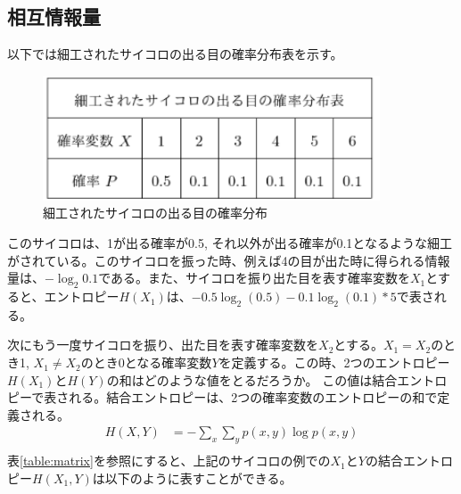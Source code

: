 \documentclass{ltjsarticle}
\begin{document}
\subsection{相互情報量}
以下では細工されたサイコロの出る目の確率分布表を示す。
\begin{figure}[htbp]
  \centering
  \includegraphics[width=10cm]{./entropy.png}
  \caption{細工されたサイコロの出る目の確率分布}
  \label{fig:dise_entropy}
\end{figure}
このサイコロは、1が出る確率が0.5, それ以外が出る確率が0.1となるような細工がされている。このサイコロを振った時、例えば4の目が出た時に得られる情報量は、$-\log_{2} 0.1$である。また、サイコロを振り出た目を表す確率変数を$X_1$とすると、エントロピー$H(X_1)$は、$-0.5\log_{2}(0.5) - 0.1\log_{2}(0.1) * 5$で表される。

次にもう一度サイコロを振り、出た目を表す確率変数を$X_2$とする。$X_1 = X_2$のとき1, $X_1 \neq X_2$のとき0となる確率変数$Y$を定義する。この時、2つのエントロピー$H(X_1)$と$H(Y)$の和はどのような値をとるだろうか。
この値は結合エントロピーで表される。結合エントロピーは、2つの確率変数のエントロピーの和で定義される。
\begin{align}
  H(X, Y) &= - \sum_{x} \sum_{y} p(x, y) \log p(x, y)\\
\end{align}
表\ref{table:matrix}を参照にすると、上記のサイコロの例での$X_1$と$Y$の結合エントロピー$H(X_1, Y)$は以下のように表すことができる。

\end{document}
